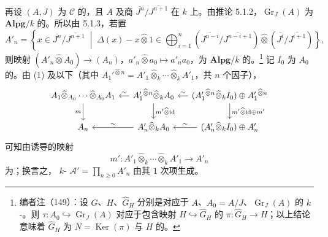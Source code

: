 再设 $(A,J)$ 为 $\mathcal C$ 的，且 $A$ 及商 $\overline{J^n}/\overline{J^{n+1}}$ 在 $k$ 上。由推论 5.1.2，$\operatorname{Gr}_J(A)$ 为 $\mathbf{Alpg}/k$ 的。所以由 5.1.3，若置
\[
A'_n=\left\{x\in\overline{J^n}/\overline{J^{n+1}}\;\middle|\;
\Delta(x)-x\widehat\otimes1\in\bigoplus_{i=1}^n
(\overline{J^{n-i}}/\overline{J^{n-i+1}})\widehat\otimes
(\overline{J^i}/\overline{J^{i+1}})\right\},\tag{2}
\]
则映射 $(A'_n\widehat\otimes A_0)\to(A_n)$，$a'_n\widehat\otimes a_0\mapsto a'_na_0$，为 $\mathbf{Alpg}/k$ 的。\footnote{编者注（149）：设 $G$、$H$、$\widehat G_H$ 分别是对应于 $A$、$A_0=A/J$、$\operatorname{Gr}_J(A)$ 的 $k$-。则 $\tau:A_0\hookrightarrow\operatorname{Gr}_J(A)$ 对应于包含映射 $H\hookrightarrow\widehat G_H$ 的 $\pi:\widehat G_H\to H$；以上结论意味着 $\widehat G_H$ 为 $N=\operatorname{Ker}(\pi)$ 与 $H$ 的。}
记 $I_0$ 为 $A_0$ 的。由 (1) 及以下（其中 $A_1'{}^{\widehat\otimes n}=A'_1\widehat\otimes_k\cdots\widehat\otimes_kA'_1$，共 $n$ 个因子），
\[
\begin{tikzcd}[column sep=small]
A_1\widehat\otimes_{A_0}\cdots\widehat\otimes_{A_0}A_1\arrow[d,"m"']&A_1'{}^{\widehat\otimes n}\widehat\otimes_k A_0\arrow[l,"\sim"']\arrow[d,"m'\widehat\otimes\mathrm{id}"]&(A_1'{}^{\widehat\otimes n}\widehat\otimes_k I_0)\oplus A_1'{}^{\widehat\otimes n}\arrow[l,"\sim"']\arrow[d,"{m'\widehat\otimes\mathrm{id}\oplus m'}"]\\
A_n&A'_n\widehat\otimes_kA_0\arrow[l,"\sim"']&(A'_n\widehat\otimes_kI_0)\oplus A'_n\arrow[l,"\sim"']
\end{tikzcd}
\]
可知由诱导的映射
\[m':A'_1\widehat\otimes_k\cdots\widehat\otimes_kA'_1\longrightarrow A'_n\tag{3}\]
为；换言之， $k$- $\mathscr A'=\prod_{n\geq0}A'_n$ 由其 $1$ 次项生成。

